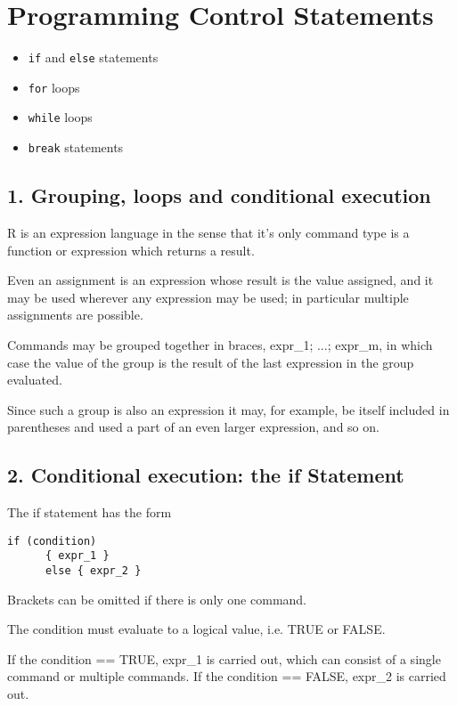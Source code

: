 \section{Programming Control Statements}


\begin{itemize}
\item \texttt{if} and \texttt{else} statements
\item \texttt{for} loops
\item \texttt{while} loops
\item \texttt{break} statements
\end{itemize}
\subsection{1.	Grouping, loops and conditional execution}
R is an expression language in the sense that it’s only command type is a function or expression which returns a result. 

Even an assignment is an expression whose result is the value assigned, and it may be used wherever any expression may be used; in particular multiple assignments are possible. 

Commands may be grouped together in braces, {expr_1; ...; expr_m}, in which case the value of the group is the result of the last expression in the group evaluated. 

Since such a group is also an expression it may, for example, be itself included in parentheses and used a part of an even larger expression, and so on.  

\subsection*{2.	Conditional execution: the if Statement}

The if statement has the form 

\begin{verbatim}
if (condition)
      { expr_1 }
      else { expr_2 }
\end{verbatim}
Brackets can be omitted if there is only one command. 

The condition must evaluate to a logical value, i.e. TRUE or FALSE. 

If the condition == TRUE, expr_1 is carried out, which can consist of a single command or multiple commands. If the condition == FALSE, expr_2 is carried out.

